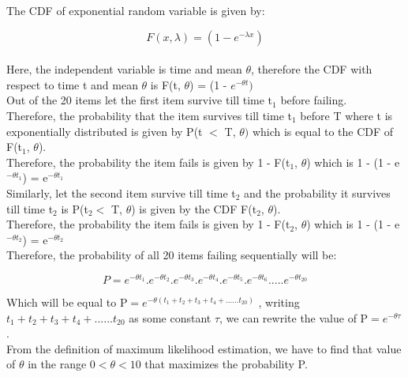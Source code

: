 \documentclass[12pt]{article}
\begin{document}
\clearpage
\noindent The CDF of exponential random variable is given by:

\begin{equation}
    F(x, \lambda) = ( 1 - e^{- \lambda x})
\end{equation}
\\
\noindent Here, the independent variable is time and mean $\theta$, therefore the CDF with respect to time t and mean $\theta$ is F(t, $\theta$) = (1 - $e^{- \theta t})$
\\

\noindent Out of the 20 items let the first item survive till time t$_1$ before failing.
\\

\noindent Therefore, the probability that the item survives till time t$_1$ before T where t is exponentially distributed is given by P(t $<$ T, $\theta)$ which is equal to the CDF of F(t$_1$, $\theta$).
\\

\noindent Therefore, the probability the item fails is given by 1 - F(t$_1$, $\theta$) which is 1 - (1 - e$^{-\theta t_1}$) = e$^{-\theta t_1}$
\\

\noindent Similarly, let the second item survive till time t$_2$ and the probability it survives till time t$_2$ is P(t$_2 <$ T, $\theta$) is given by the CDF F(t$_2$, $\theta$).
\\

\noindent Therefore, the probability the item fails is given by 1 - F(t$_2$, $\theta$) which is 1 - (1 - e$^{-\theta t_2}$) = e$^{-\theta t_2}$
\\

\noindent Therefore, the probability of all 20 items failing sequentially will be:

$$
P = e^{-\theta t_1}.e^{-\theta t_2}.e^{-\theta t_3}.e^{-\theta t_4}.e^{-\theta t_5}.e^{-\theta t_6}.....e^{-\theta t_{20}}
$$
\vspace{1mm}

\noindent Which will be equal to P$ = e^{-\theta ({t_1 + t_2 + t_3 + t_4 + ...... t_{20}})}$ , writing $t_1 + t_2 + t_3 + t_4 + ...... t_{20}$ as some constant $\tau$, we can rewrite the value of P$ = e^{-\theta \tau}$.
\\

\noindent From the definition of maximum likelihood estimation, we have to find that value of $\theta$ in the range $0 < \theta < 10$ that maximizes the probability P.
\\
\end{document}
